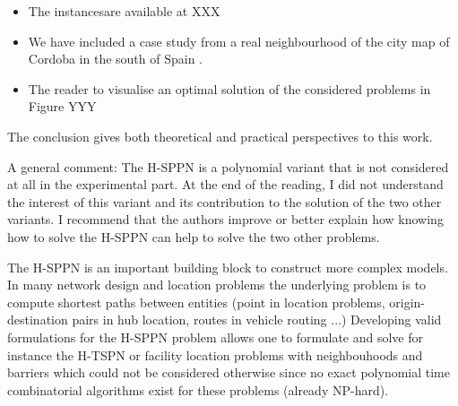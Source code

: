 \documentclass{article}
\newenvironment{reviewer}{\setcounter{pointcounter}{1}}{}
\newcommand{\point}{\text{{\selectfont \thepointcounter} \stepcounter{pointcounter}}}
\begin{document}
\begin{reviewer}
		\begin{tcolorbox}[breakable,enhanced,coltitle=black,colback=green!5!white,colframe=green!75!black,title=\textbf{Answer R2.\point},borderline={1pt}{0pt}{black},boxrule=0pt]
		\begin{itemize}
			\item The instancesare available at XXX
			\item We have included a case study  from a real neighbourhood of the city map of Cordoba in the south of Spain .
			\item  The reader to visualise an optimal solution of the considered problems in Figure YYY
			\end{itemize}
			
		\end{tcolorbox}
		
		\begin{itshape}
			The conclusion gives both theoretical and practical perspectives to this work.
		\end{itshape}
		
		\begin{tcolorbox}[breakable,enhanced,coltitle=black,colback=green!5!white,colframe=green!75!black,title=\textbf{Answer R2.\point},borderline={1pt}{0pt}{black},boxrule=0pt]
			
		\end{tcolorbox}
		
		\begin{itshape}
			A general comment: The H-SPPN is a polynomial variant that is not considered at all in the experimental part. At the end of the reading, I did not understand the interest of this variant and its contribution to the solution of the two other variants. I recommend that the authors improve or better explain how knowing how to solve the H-SPPN can help to solve the two other problems.
		\end{itshape}
		
		\begin{tcolorbox}[breakable,enhanced,coltitle=black,colback=green!5!white,colframe=green!75!black,title=\textbf{Answer R2.\point},borderline={1pt}{0pt}{black},boxrule=0pt]
			The H-SPPN is an important building block to construct more complex models. In many network design and location problems the underlying problem is to compute shortest paths between entities (point in location problems, origin-destination pairs in hub location, routes in vehicle routing ...)
 Developing valid formulations for the H-SPPN problem allows one to formulate and solve for instance the H-TSPN or facility location problems with neighbouhoods and barriers which could not be considered otherwise since no exact polynomial time combinatorial algorithms exist for these problems (already NP-hard).
 		\end{tcolorbox}
		
	\end{reviewer}
	
	
\end{document}
